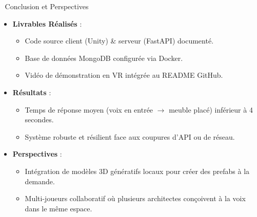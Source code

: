 \documentclass[aspectratio=169]{beamer}
\begin{document}
\begin{frame}{🎯 Conclusion et Perspectives}
  \begin{itemize}
    \item \textbf{Livrables Réalisés} :
      \begin{itemize}
        \item Code source client (Unity) \& serveur (FastAPI) documenté.
        \item Base de données MongoDB configurée via Docker.
        \item Vidéo de démonstration en VR intégrée au README GitHub.
      \end{itemize}
    \item \textbf{Résultats} :
      \begin{itemize}
        \item Temps de réponse moyen (voix en entrée $\rightarrow$ meuble placé) inférieur à 4 secondes.
        \item Système robuste et résilient face aux coupures d'API ou de réseau.
      \end{itemize}
    \item \textbf{Perspectives} :
      \begin{itemize}
        \item Intégration de modèles 3D génératifs locaux pour créer des prefabs à la demande.
        \item Multi-joueurs collaboratif où plusieurs architectes conçoivent à la voix dans le même espace.
      \end{itemize}
  \end{itemize}

\end{frame}
\end{document}
